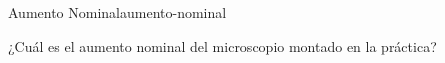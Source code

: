\begin{problem}{Aumento Nominal}{aumento-nominal}

¿Cuál es el aumento nominal del microscopio montado en la práctica?

\end{problem}